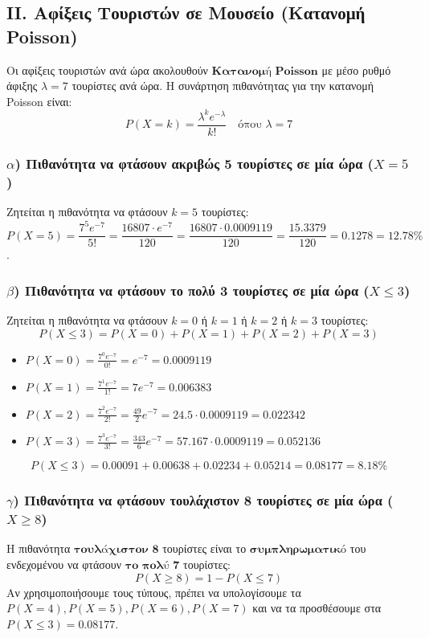 \documentclass[11pt,a4paper]{article}
\begin{document}
\subsection*{II. Αφίξεις Τουριστών σε Μουσείο (Κατανομή Poisson)}

Οι αφίξεις τουριστών ανά ώρα ακολουθούν $\textbf{Κατανομή Poisson}$ με μέσο ρυθμό άφιξης $\lambda = 7$ τουρίστες ανά ώρα.
Η συνάρτηση πιθανότητας για την κατανομή Poisson είναι:
$$P(X=k) = \frac{\lambda^k e^{-\lambda}}{k!} \quad \text{όπου } \lambda=7$$
\subsubsection*{$\alpha$) Πιθανότητα να φτάσουν ακριβώς 5 τουρίστες σε μία ώρα ($X=5$)}
Ζητείται η πιθανότητα να φτάσουν $k=5$ τουρίστες:
$$P(X=5) = \frac{7^5 e^{-7}}{5!} = \frac{16807 \cdot e^{-7}}{120} = \frac{16807 \cdot 0.0009119}{120} = \frac{15.3379}{120}= 0.1278=12.78\%$$.

\subsubsection*{$\beta$) Πιθανότητα να φτάσουν το πολύ 3 τουρίστες σε μία ώρα ($X \le 3$)}
Ζητείται η πιθανότητα να φτάσουν $k=0$ ή $k=1$ ή $k=2$ ή $k=3$ τουρίστες:
$$P(X \le 3) = P(X=0) + P(X=1) + P(X=2) + P(X=3)$$

\begin{itemize}
    \item $P(X=0) = \frac{7^0 e^{-7}}{0!} = e^{-7} = 0.0009119$
    \item $P(X=1) = \frac{7^1 e^{-7}}{1!} = 7 e^{-7} = 0.006383$
    \item $P(X=2) = \frac{7^2 e^{-7}}{2!} = \frac{49}{2} e^{-7} = 24.5 \cdot 0.0009119 = 0.022342$
    \item $P(X=3) = \frac{7^3 e^{-7}}{3!} = \frac{343}{6} e^{-7} = 57.167 \cdot 0.0009119 = 0.052136$
\end{itemize}
$$P(X \le 3) = 0.00091 + 0.00638 + 0.02234 + 0.05214 = 0.08177=8.18\%$$
\subsubsection*{$\gamma$) Πιθανότητα να φτάσουν τουλάχιστον 8 τουρίστες σε μία ώρα ($X \ge 8$)}
Η πιθανότητα $\textbf{τουλάχιστον 8}$ τουρίστες είναι το $\textbf{συμπληρωματικό}$ του ενδεχομένου να φτάσουν $\textbf{το πολύ 7}$ τουρίστες:
$$P(X \ge 8) = 1 - P(X \le 7)$$
Αν χρησιμοποιήσουμε τους τύπους, πρέπει να υπολογίσουμε τα $P(X=4), P(X=5), P(X=6), P(X=7)$ και να τα προσθέσουμε στα $P(X \le 3) = 0.08177$.
\end{document}
